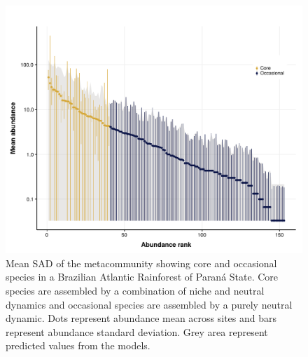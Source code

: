 \documentclass[12pt]{article}
\begin{document}
\begin{figure}[!h]
 \begin{center}
\includegraphics[scale=.75]{./fig/rad_metacommunity.pdf}
\end{center}
\caption{Mean SAD of the metacommunity showing core and occasional species in a Brazilian Atlantic Rainforest of Paran\'a State. Core species are assembled by a combination of niche and neutral dynamics and occasional species are assembled by a purely neutral dynamic. Dots represent abundance mean across sites and bars represent abundance standard deviation. Grey area represent predicted values from the models.}\label{fig:rad} %
\end{figure}
\end{document}
